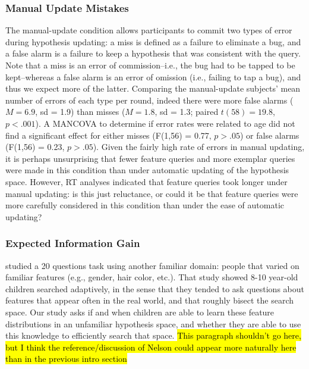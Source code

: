 \documentclass[10pt,letterpaper]{article}
\begin{document}
  \vspace{.05cm}
  

\subsubsection{Manual Update Mistakes}

The manual-update condition allows participants to commit two types of error during 
hypothesis updating: a miss is defined as a failure to eliminate a bug, and a false 
alarm is a failure to keep a hypothesis that was consistent with the query. Note that 
a miss is an error of commission--i.e., the bug had to be tapped to be kept--whereas 
a false alarm is an error of omission (i.e., failing to tap a bug), and thus we expect 
more of the latter. Comparing the manual-update subjects' mean number of errors of 
each type per round, indeed there were more false alarms ($M=6.9$, sd = 1.9) than 
misses ($M=1.8$, sd = 1.3; paired $t(58) = 19.8$, $p<.001$). A MANCOVA to 
determine if error rates were related to age did not find a significant effect for either 
misses (F(1,56) = 0.77, $p>.05$) or false alarms (F(1,56) = 0.23, $p>.05$). Given 
the fairly high rate of errors in manual updating, it is perhaps unsurprising that fewer 
feature queries and more exemplar queries were made in this condition than under 
automatic updating of the hypothesis space. However, RT analyses indicated that 
feature queries took longer under manual updating: is this just reluctance, or could it 
be that feature queries were more carefully considered in this condition than under 
the ease of automatic updating? 

\subsubsection{Expected Information Gain}



 studied a 20 questions task using another familiar domain: 
people that varied on familiar features (e.g., gender, hair color, etc.). That study 
showed 8-10 year-old children searched adaptively, in the sense that they tended to 
ask questions about features that appear often in the real world, and that roughly 
bisect the search space. Our study asks if and when children are able to learn these 
feature distributions in an unfamiliar hypothesis space, and whether they are able to 
use this knowledge to efficiently search that space.
\hl{This paragraph shouldn't go here, but I think the reference/discussion of
Nelson could appear more naturally here than in the previous intro section}
\end{document}
